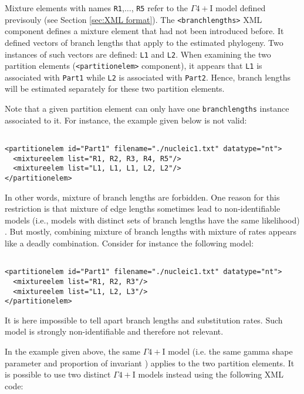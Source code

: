 \documentclass[a4paper,12pt]{article}
\newcommand{\x}[1]{\texttt{#1}}
\begin{document}
Mixture elements with names  \x{R1},$\ldots$, \x{R5} refer to the $\Gamma4+$I model defined
previsouly  (see Section  \ref{sec:XML format}).   The \x{<branchlengths>}  XML component  defines a
mixture element  that had not  been introduced  before.  It defined  vectors of branch  lengths that
apply to the estimated phylogeny. Two instances of  such vectors are defined: \x{L1} and \x{L2}.
When examining the  two partition elements (\x{<partitionelem>} component), it  appears that \x{L1}
is associated with \x{Part1} while \x{L2} is associated with \x{Part2}.  Hence, branch lengths
will be estimated separately for these two partition elements.  

Note that  a given partition element  can only have  one {\tt branchlengths} instance  associated to
it. For instance, the example given below is not valid:

\vspace{0.2cm}
\begin{Verbatim}[frame=single, label=Invalid mixture, samepage=true, baselinestretch=0.5]

<partitionelem id="Part1" filename="./nucleic1.txt" datatype="nt">
  <mixtureelem list="R1, R2, R3, R4, R5"/>
  <mixtureelem list="L1, L1, L1, L2, L2"/>
</partitionelem>

\end{Verbatim}

In other words, mixture of branch lengths are forbidden. One reason for this restriction is that
mixture of edge lengths sometimes lead to non-identifiable models (i.e., models with distinct sets
of branch lengths have the same likelihood) \cite{matsen07}. But mostly, combining mixture of branch
lengths with mixture of rates appears like a deadly combination. Consider for instance the following model:

\vspace{0.2cm}
\begin{Verbatim}[frame=single, label=Invalid mixture, samepage=true, baselinestretch=0.5]

<partitionelem id="Part1" filename="./nucleic1.txt" datatype="nt">
  <mixtureelem list="R1, R2, R3"/>
  <mixtureelem list="L1, L2, L3"/>
</partitionelem>

\end{Verbatim}

It is here impossible to tell apart  branch lengths and substitution rates. Such model is strongly
non-identifiable and therefore not relevant.

In the example given above, the same $\Gamma4+$I model (i.e. the same gamma shape parameter and
proportion of invariant ) applies to the two partition elements. It is possible to use two distinct
$\Gamma4+$I models instead using the following XML code:
\end{document}
